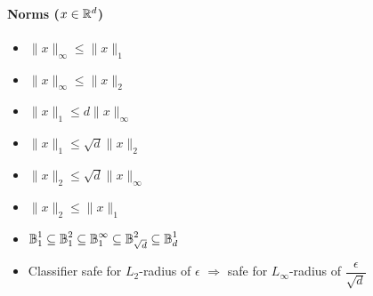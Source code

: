 \paragraph{Norms ($x \in \mathbb{R}^d$)}
\begin{itemize}
\item $\|x\|_\infty \le \|x\|_1$
\item $\|x\|_\infty \le \|x\|_2$

\item $\|x\|_1 \le d \|x\|_\infty$
\item $\|x\|_1 \le \sqrt{d} \|x\|_2$

\item $\|x\|_2 \le \sqrt{d} \|x\|_\infty$
\item $\|x\|_2 \le \|x\|_1$
\item $\operatorname*{\mathbb{B}}_1^1 \subseteq \operatorname*{\mathbb{B}}_1^2 \subseteq \operatorname*{\mathbb{B}}_1^\infty \subseteq \operatorname*{\mathbb{B}}_{\sqrt{d}}^2 \subseteq \operatorname*{\mathbb{B}}_d^1$
\item Classifier safe for $L_2$-radius of $\epsilon$ $\Rightarrow$ safe for $L_\infty$-radius of $\dfrac{\epsilon}{\sqrt{d}}$
\end{itemize}